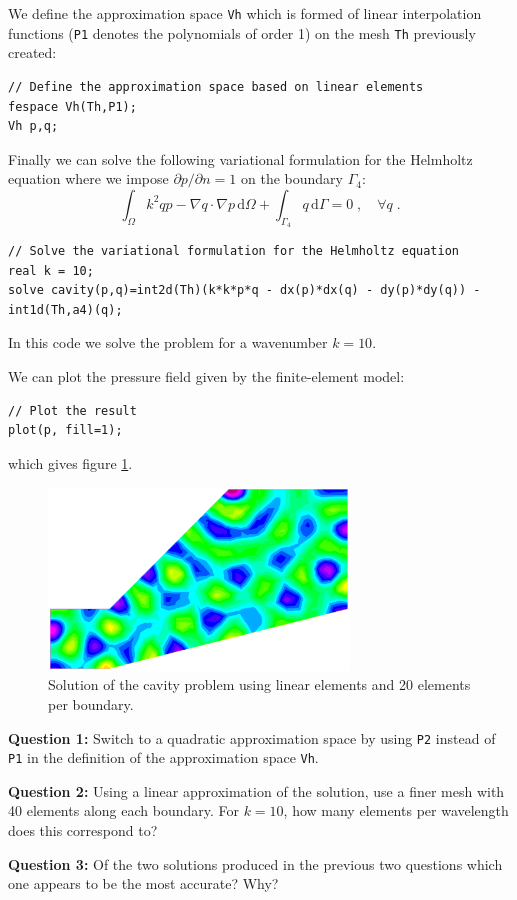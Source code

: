 \documentclass[english,3p]{elsarticle}
\newcommand{\code}[1]{\texttt{#1}}
\newcommand{\dd}{\mathrm{d}}
\begin{document}
We define the approximation space \code{Vh} which is formed of linear interpolation functions (\code{P1} denotes the polynomials of order 1) on the mesh \code{Th} previously created:
\begin{lstlisting}
// Define the approximation space based on linear elements
fespace Vh(Th,P1);
Vh p,q;
\end{lstlisting}

Finally we can solve the following variational formulation for the Helmholtz equation where we impose $\partial p/\partial n=1$ on the boundary $\Gamma_4$:
$$
\int_\Omega k^2qp - \nabla q\cdot\nabla p\,\dd\Omega+
\int_{\Gamma_4} q\,\dd\Gamma
=0
\;,\quad
\forall q
\;.
$$
\begin{lstlisting}
// Solve the variational formulation for the Helmholtz equation
real k = 10;
solve cavity(p,q)=int2d(Th)(k*k*p*q - dx(p)*dx(q) - dy(p)*dy(q)) - int1d(Th,a4)(q);
\end{lstlisting}
In this code we solve the problem for a wavenumber $k=10$.

We can plot the pressure field given by the finite-element model:
\begin{lstlisting}
// Plot the result
plot(p, fill=1);
\end{lstlisting}
which gives figure \ref{fig:solution1}.
\begin{figure}[h]
\centering
\includegraphics[width=80mm]{solution_P1.eps}
\caption{Solution of the cavity problem using linear elements and 20 elements per boundary.}
\label{fig:solution1}
\end{figure}

\textbf{Question 1:} Switch to a quadratic approximation space by using \code{P2} instead of \code{P1} in the definition of the approximation space \code{Vh}.

\textbf{Question 2:} Using a linear approximation of the solution, use a finer mesh with 40 elements along each boundary.
For $k=10$, how many elements per wavelength does this correspond to?

\textbf{Question 3:} Of the two solutions produced in the previous two questions which one appears to be the most accurate? Why?
\end{document}
